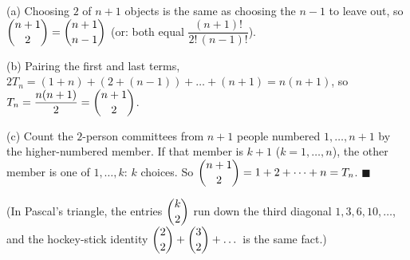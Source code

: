 (a) Choosing $2$ of $n+1$ objects is the same as choosing the $n-1$ to leave out, so $\dbinom{n+1}2=\dbinom{n+1}{n-1}$ (or: both equal $\dfrac{(n+1)!}{2!\,(n-1)!}$).

(b) Pairing the first and last terms, $2T_n=(1+n)+(2+(n-1))+\dots+(n+1)=n(n+1)$, so $T_n=\dfrac{n(n+1)}{2}=\dbinom{n+1}{2}$.

(c) Count the $2$-person committees from $n+1$ people numbered $1,\dots,n+1$ by the higher-numbered member. If that member is $k+1$ ($k=1,\dots,n$), the other member is one of $1,\dots,k$: $k$ choices. So $\dbinom{n+1}2=1+2+\dots+n=T_n$. $\blacksquare$

(In Pascal's triangle, the entries $\dbinom{k}{2}$ run down the third diagonal $1,3,6,10,\dots$, and the hockey-stick identity $\dbinom22+\dbinom32+\dots$ is the same fact.)
